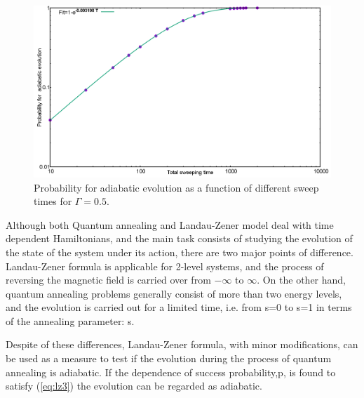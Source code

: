 \documentclass[12]{article}
\begin{document}
\begin{figure}[H]
\centering 
\includegraphics[scale=0.3]{Prob_1spin_H100.png}
\caption{Probability for adiabatic evolution as a function of different sweep times for $\Gamma=0.5$.}
\label{fig:lz3}
\end{figure}



Although both Quantum annealing and Landau-Zener model deal with time dependent Hamiltonians, and the main task consists of studying the evolution of the state of the system under its action, there are two major points of difference. Landau-Zener formula is applicable for 2-level systems, and the process of reversing the magnetic field is carried over from $-\infty$ to $\infty$. On the other hand, quantum annealing problems generally consist of more than two energy levels, and the evolution is carried out for a limited time, i.e. from s=0 to s=1 in terms of the annealing parameter: s.

Despite of these differences, Landau-Zener formula, with minor modifications, can be used as a measure to test if the evolution during the process of quantum annealing is adiabatic. If the dependence of success probability,p, is found to satisfy (\ref{eq:lz3}) the evolution can be regarded as adiabatic.
\end{document}
